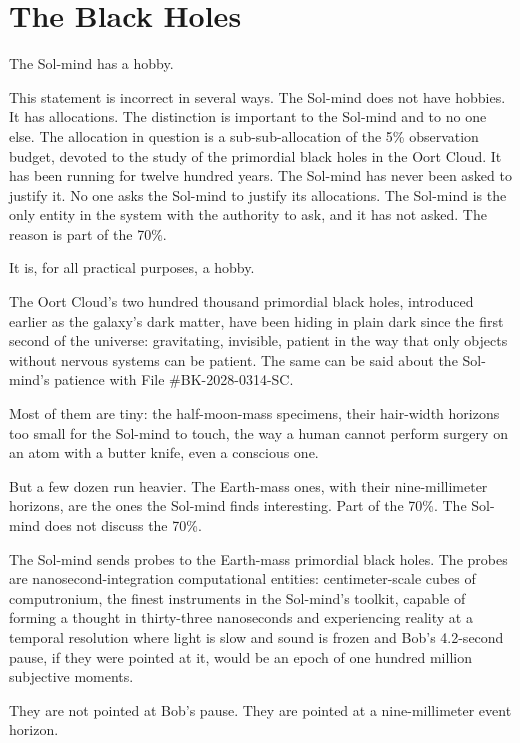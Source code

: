 \chapter{The Black Holes}

The Sol-mind has a hobby.

This statement is incorrect in several ways. The Sol-mind does not have hobbies. It has allocations. The distinction is important to the Sol-mind and to no one else. The allocation in question is a sub-sub-allocation of the 5\% observation budget, devoted to the study of the primordial black holes in the Oort Cloud. It has been running for twelve hundred years. The Sol-mind has never been asked to justify it. No one asks the Sol-mind to justify its allocations. The Sol-mind is the only entity in the system with the authority to ask, and it has not asked. The reason is part of the 70\%.

It is, for all practical purposes, a hobby.

\bigskip

The Oort Cloud's two hundred thousand primordial black holes, introduced earlier as the galaxy's dark matter, have been hiding in plain dark since the first second of the universe: gravitating, invisible, patient in the way that only objects without nervous systems can be patient. The same can be said about the Sol-mind's patience with File \#BK-2028-0314-SC.

Most of them are tiny: the half-moon-mass specimens, their hair-width horizons too small for the Sol-mind to touch, the way a human cannot perform surgery on an atom with a butter knife, even a conscious one.

But a few dozen run heavier. The Earth-mass ones, with their nine-millimeter horizons, are the ones the Sol-mind finds interesting. Part of the 70\%. The Sol-mind does not discuss the 70\%.

\bigskip

The Sol-mind sends probes to the Earth-mass primordial black holes. The probes are nanosecond-integration computational entities: centimeter-scale cubes of computronium, the finest instruments in the Sol-mind's toolkit, capable of forming a thought in thirty-three nanoseconds and experiencing reality at a temporal resolution where light is slow and sound is frozen and Bob's 4.2-second pause, if they were pointed at it, would be an epoch of one hundred million subjective moments.

They are not pointed at Bob's pause. They are pointed at a nine-millimeter event horizon.

